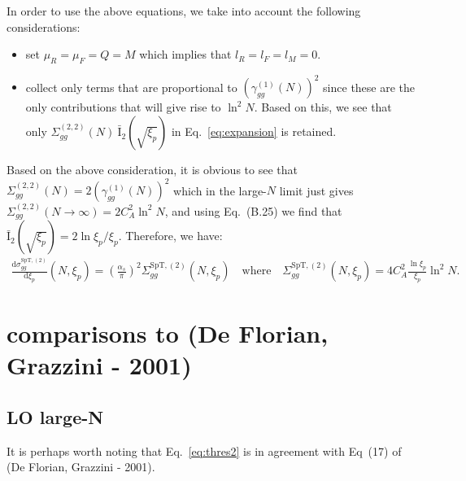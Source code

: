 \documentclass[10pt]{report}
\newcommand{\dd}{\mathrm{d}}
\begin{document}
In order to use the above equations, we take into account the following considerations:
\begin{itemize}
	\item set $\mu_R = \mu_F = Q = M$ which implies that $l_R = l_F = l_M = 0$.
	\item collect only terms that are proportional to $\left( \gamma^{(1)}_{gg} (N) \right)^2$ since these are the only contributions that will
	give rise to $\ln^2 N$. Based on this, we see that only $\Sigma^{(2,2)}_{gg} (N) ~ \bar{\mathrm{I}}_2 (\sqrt{\xi_p})$ in Eq.~\eqref{eq:expansion} is retained.
\end{itemize}
Based on the above consideration, it is obvious to see that $\Sigma^{(2,2)}_{gg} (N) = 2 \left( \gamma^{(1)}_{gg} (N) \right)^2$ which in the large-$N$
limit just gives $\Sigma^{(2,2)}_{gg} (N \to \infty) = 2 C_A^2 \ln^2N$, and using Eq.~(B.25) we find that $\bar{\mathrm{I}}_2 (\sqrt{\xi_p}) =
2 \ln \xi_p/ \xi_p$. Therefore, we have:
\begin{align}
	\frac{\dd \sigma^{\text{SpT},(2)}_{gg}}{\dd \xi_p} (N, \xi_p) = \left( \frac{\alpha_s}{\pi} \right)^2  \Sigma^{\text{SpT},(2)}_{gg} (N, \xi_p)
	\quad \text{where} \quad \Sigma^{\text{SpT},(2)}_{gg} (N, \xi_p) = 4 C_A^2 \frac{\ln \xi_p}{\xi_p} \ln^2N.
\label{eq:smallpt_alphas2_bozzi}
\end{align}





\section{comparisons to (De Florian, Grazzini - 2001)}

\subsection{LO large-N}
It is perhaps worth noting that Eq.~\eqref{eq:thres2} is in agreement with Eq~(17) of (De Florian, Grazzini - 2001). 
\end{document}
